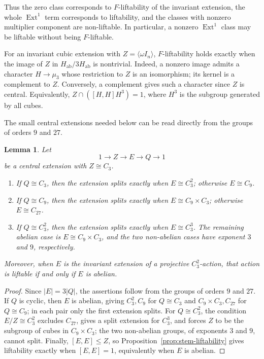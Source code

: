 \documentclass[12pt]{amsart}
\numberwithin{equation}{section}
\theoremstyle{plain}
\newtheorem{lem}[thm]{Lemma}
\theoremstyle{definition}
\theoremstyle{remark}
\begin{document}
Thus the zero class corresponds to $F$-liftability of the invariant
extension, the whole $\operatorname{Ext}^1$ term corresponds to liftability,
and the classes with nonzero multiplier component are non-liftable.  In
particular, a nonzero $\operatorname{Ext}^1$ class may be liftable without
being $F$-liftable.

For an invariant cubic extension with $Z=\langle\omega I_n\rangle$,
$F$-liftability holds exactly when the image of $Z$ in
$H_{\mathrm{ab}}/3H_{\mathrm{ab}}$ is nontrivial.  Indeed, a nonzero image
admits a character $H\to\mu_3$ whose restriction to $Z$ is an isomorphism;
its kernel is a complement to $Z$.  Conversely, a complement gives such
a character since $Z$ is central.  Equivalently,
$Z\cap([H,H]H^3)=1$, where $H^3$ is the subgroup generated by all cubes.

The small central extensions needed below can be read directly from the
groups of orders $9$ and $27$.

\begin{lem}\label{lem:small-central-extensions}
Let
\[
1\longrightarrow Z\longrightarrow E\longrightarrow Q\longrightarrow1
\]
be a central extension with $Z\cong C_3$.
\begin{enumerate}
    \item If $Q\cong C_3$, then the extension splits exactly when
    $E\cong C_3^2$; otherwise $E\cong C_9$.

    \item If $Q\cong C_9$, then the extension splits exactly when
    $E\cong C_9\times C_3$; otherwise $E\cong C_{27}$.

    \item If $Q\cong C_3^2$, then the extension splits exactly when
    $E\cong C_3^3$.  The remaining abelian case is
    $E\cong C_9\times C_3$, and the two non-abelian cases have exponent
    $3$ and $9$, respectively.
\end{enumerate}
Moreover, when $E$ is the invariant extension of a projective
$C_3^2$-action, that action is liftable if and only if $E$ is abelian.
\end{lem}

\begin{proof}
Since $|E|=3|Q|$, the assertions follow from the groups of orders $9$ and
$27$.  If $Q$ is cyclic, then $E$ is abelian, giving $C_3^2,C_9$ for
$Q\cong C_3$ and $C_9\times C_3,C_{27}$ for $Q\cong C_9$; in each pair only
the first extension splits. For $Q\cong C_3^2$, the condition $E/Z\cong C_3^2$
excludes $C_{27}$, gives a split extension for $C_3^3$, and forces $Z$ to be
the subgroup of cubes in $C_9\times C_3$; the two non-abelian groups, of
exponents $3$ and $9$, cannot split.  Finally, $[E,E]\leq Z$, so
Proposition~\ref{prop:stem-liftability} gives liftability exactly when
$[E,E]=1$, equivalently when $E$ is abelian.
\end{proof}
\end{document}
